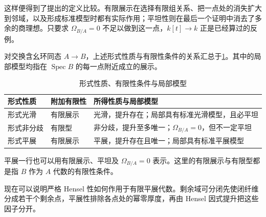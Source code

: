 这样便得到了提出的定义比较。有限展示在选择有限组关系、把一点处的消失扩大到邻域，以及形成标准模型时都有实际作用；平坦性则在最后一个证明中消去了多余的商理想。只要求 \(\Omega_{B/A}=0\) 不足以做到这一点，\(k[t]\to k\) 正是已经算过的反例。

\ProseParagraphBreak
对交换含幺环同态 \(A\to B\)，上述形式性质与有限性条件的关系汇总于\cref{b3:tab:formal-geometric-finiteness}。其中的局部模型均指在 \(\operatorname{Spec}B\) 的每一点附近成立的展示。

\begin{table}[htbp]
	\centering
	\caption{形式性质、有限性条件与局部模型}
	\label{b3:tab:formal-geometric-finiteness}
	\begin{tabularx}{\textwidth}{@{}l l X@{}}
		\toprule
		形式性质 & 附加有限性 & 所得性质与局部模型 \\
		\midrule
		形式光滑 & 有限展示 & 光滑，提升存在；局部具有标准光滑模型，且必平坦 \\
		形式非分歧 & 有限型 & 非分歧，提升至多唯一；\(\Omega_{B/A}=0\)，但不一定平坦 \\
		形式平展 & 有限展示 & 平展，提升存在且唯一；局部具有标准平展模型 \\
		\bottomrule
	\end{tabularx}
\end{table}

平展一行也可以用有限展示、平坦及 \(\Omega_{B/A}=0\) 表示。这里的有限展示与有限型都是指 \(B\) 作为 \(A\) 代数的有限性条件。

\ProseParagraphBreak
现在可以说明严格 Hensel 性如何作用于有限平展代数。剩余域可分闭先使闭纤维分成若干个剩余点，平展性排除各点处的幂零厚度，再由 Hensel 因式提升把这些因子分开。

